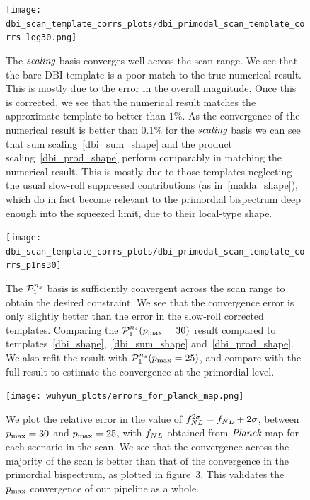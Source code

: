 \begin{figure}[htb!]
\centering
\texttt{[image: dbi\_scan\_template\_corrs\_plots/dbi\_primodal\_scan\_template\_corrs\_log30.png]}
\caption{
    The $\textit{scaling}$ basis converges well across the scan range.
    We see that the bare DBI template is a poor match to the true numerical result.
    This is mostly due to the error in the overall magnitude.
    Once this is corrected, we see that the numerical result matches the
    approximate template to better than $1\%$. As the convergence of the
    numerical result is better than $0.1\%$ for the $\textit{scaling}$ basis
    we can see that sum scaling~\eqref{dbi_sum_shape} and the
    product scaling~\eqref{dbi_prod_shape} perform
    comparably in matching the numerical result. This is mostly
    due to those templates neglecting the usual slow-roll suppressed
    contributions (as in~\eqref{malda_shape}),
    which do in fact become relevant to the primordial
    bispectrum deep enough into the squeezed limit, due to their local-type shape.
}\label{fig:dbi_primodal_scan_template_corrs_log30}
\end{figure}
\begin{figure}[htb!]
\centering
\texttt{[image: dbi\_scan\_template\_corrs\_plots/dbi\_primodal\_scan\_template\_corrs\_p1ns30]}
\caption{
    The $\mathcal{P}^{n_s}_1$ basis is sufficiently convergent across the scan range
    to obtain the desired constraint.
    We see that the convergence error is only slightly better than the error
    in the slow-roll corrected templates.
    Comparing the $\mathcal{P}^{n_s}_1(p_\text{max}=30)$ result compared to
    templates~\eqref{dbi_shape},~\eqref{dbi_sum_shape} and~\eqref{dbi_prod_shape}.
    We also refit the result with $\mathcal{P}^{n_s}_1(p_\text{max}=25)$, and compare with the full
    result to estimate the convergence at the primordial level.
}\label{fig:dbi_primodal_scan_template_corrs_p1ns}
\end{figure}
\begin{figure}[htb!]
\centering
\texttt{[image: wuhyun\_plots/errors\_for\_planck\_map.png]}
\caption{
    We plot the relative error in the value of $f_{NL}^{2\sigma}=f_{NL}+2\sigma$,
    between $p_\text{max}=30$ and $p_\text{max}=25$,
    with $f_{NL}$ obtained from $\textit{Planck}$ map for each scenario in the scan.
    We see that the convergence across the majority of the scan is better than that of the
    convergence in the primordial bispectrum, as plotted in figure~\ref{fig:dbi_primodal_scan_template_corrs_p1ns}.
    This validates the $p_\text{max}$ convergence of our pipeline as a whole.
}\label{fig:dbi_primodal_scan_template_corrs_p1ns}
\end{figure}


